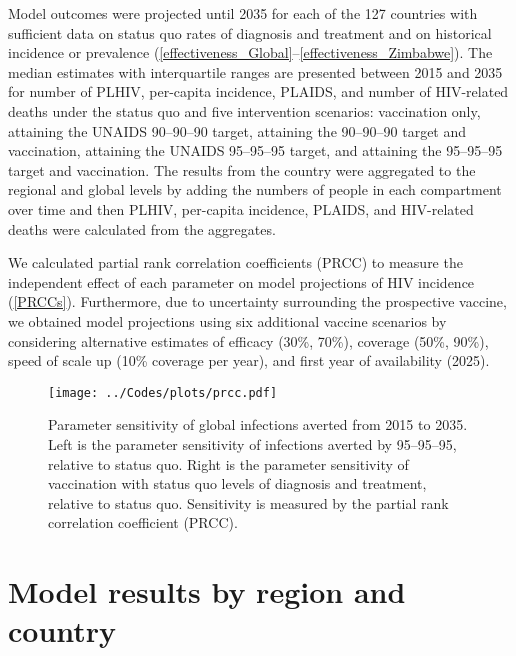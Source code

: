 \documentclass{article}
\begin{document}
Model outcomes were projected until 2035 for each of the 127 countries
with sufficient data on status quo rates of diagnosis and treatment
and on historical incidence or prevalence
(\hyperref[effectiveness_Global]{\autoref*{effectiveness_Global}}--\ref{effectiveness_Zimbabwe}). The
median estimates with interquartile ranges are presented between 2015
and 2035 for number of PLHIV, per-capita incidence, PLAIDS, and number
of HIV-related deaths under the status quo and five intervention
scenarios: vaccination only, attaining the UNAIDS 90--90--90 target,
attaining the 90--90--90 target and vaccination, attaining the UNAIDS
95--95--95 target, and attaining the 95--95--95 target and
vaccination.  The results from the country were aggregated to the
regional and global levels by adding the numbers of people in each
compartment over time and then PLHIV, per-capita incidence, PLAIDS,
and HIV-related deaths were calculated from the aggregates.

We calculated partial rank correlation coefficients (PRCC)
\cite{blower1994} to measure the independent effect of each parameter
on model projections of HIV incidence (\autoref{PRCCs}). Furthermore,
due to uncertainty surrounding the prospective vaccine, we obtained
model projections using six additional vaccine scenarios by
considering alternative estimates of efficacy (30\%, 70\%), coverage
(50\%, 90\%), speed of scale up (10\% coverage per year), and first
year of availability (2025).

\begin{figure}
  \centering
  \texttt{[image: ../Codes/plots/prcc.pdf]}
  \caption{Parameter sensitivity of global infections averted from
    2015 to 2035.  Left is the parameter sensitivity of infections
    averted by 95--95--95, relative to status quo.  Right is the
    parameter sensitivity of vaccination with status quo levels of
    diagnosis and treatment, relative to status quo.  Sensitivity is
    measured by the partial rank correlation coefficient (PRCC).}
  \label{PRCCs}
\end{figure}


\clearpage
\printbibliography


\clearpage
\newpage
\vspace*{3in}
\section{Model results by region and country}
\newpage

\end{document}
